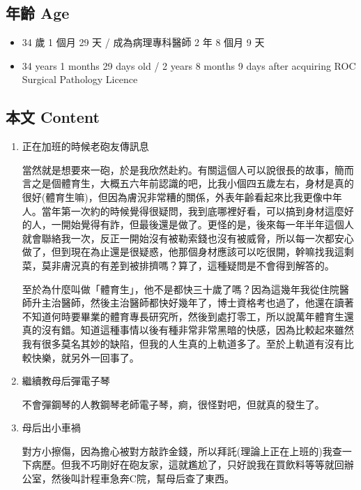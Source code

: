 \documentclass[
]{article}
\providecommand{\tightlist}{%
  \setlength{\itemsep}{0pt}\setlength{\parskip}{0pt}}
\begin{document}
\hypertarget{ux5e74ux9f61-age-18}{%
\subsection{年齡 Age}\label{ux5e74ux9f61-age-18}}

\begin{itemize}
\tightlist
\item
  34 歲 1 個月 29 天 / 成為病理專科醫師 2 年 8 個月 9 天
\item
  34 years 1 months 29 days old / 2 years 8 months 9 days after
  acquiring ROC Surgical Pathology Licence
\end{itemize}

\hypertarget{ux672cux6587-content-18}{%
\subsection{本文 Content}\label{ux672cux6587-content-18}}

\begin{enumerate}
\def\labelenumi{\arabic{enumi}.}
\item
  正在加班的時候老砲友傳訊息

  當然就是想要來一砲，於是我欣然赴約。有關這個人可以說很長的故事，簡而言之是個體育生，大概五六年前認識的吧，比我小個四五歲左右，身材是真的很好(體育生嘛)，但因為膚況非常糟的關係，外表年齡看起來比我更像中年人。當年第一次約的時候覺得很疑問，我到底哪裡好看，可以搞到身材這麼好的人，一開始覺得有詐，但最後還是做了。更怪的是，後來每一年半年這個人就會聯絡我一次，反正一開始沒有被勒索錢也沒有被威脅，所以每一次都安心做了，但到現在為止還是很疑惑，他那個身材應該可以吃很開，幹嘛找我這剩菜，莫非膚況真的有差到被排擠嗎？算了，這種疑問是不會得到解答的。

  至於為什麼叫做「體育生」，他不是都快三十歲了嗎？因為這幾年我從住院醫師升主治醫師，然後主治醫師都快好幾年了，博士資格考也過了，他還在讀著不知道何時要畢業的體育專長研究所，然後到處打零工，所以說萬年體育生還真的沒有錯。知道這種事情以後有種非常非常黑暗的快感，因為比較起來雖然我有很多莫名其妙的缺陷，但我的人生真的上軌道多了。至於上軌道有沒有比較快樂，就另外一回事了。
\item
  繼續教母后彈電子琴

  不會彈鋼琴的人教鋼琴老師電子琴，痾，很怪對吧，但就真的發生了。
\item
  母后出小車禍

  對方小擦傷，因為擔心被對方敲詐金錢，所以拜託(理論上正在上班的)我查一下病歷。但我不巧剛好在砲友家，這就尷尬了，只好說我在買飲料等等就回辦公室，然後叫計程車急奔C院，幫母后查了東西。
\end{enumerate}
\end{document}
